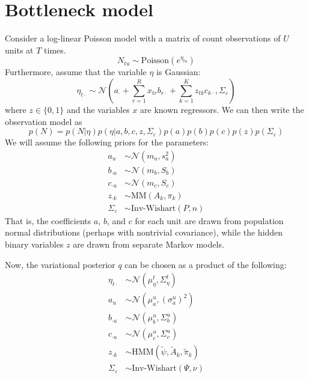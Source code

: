 \documentclass[11pt]{article}
\begin{document}
\section{Bottleneck model}
Consider a log-linear Poisson model with a matrix of count observations of $U$ units at $T$ times.
\begin{equation}
    N_{tu} \sim \mathrm{Poisson}(e^{\eta_{tu}})
\end{equation}
Furthermore, assume that the variable $\eta$ is Gaussian:
\begin{equation}
    \eta_{t\cdot} \sim \mathcal{N}\left(a_{\cdot} + \sum_{r=1}^R x_{tr} b_{r\cdot} +
    \sum_{k=1}^K z_{tk} c_{k\cdot}, \Sigma_\varepsilon\right)
\end{equation}
where $z \in \{0, 1\}$ and the variables $x$ are known regressors. We can then write the observation model as
\begin{equation}
    p(N) = p(N|\eta) p(\eta|a, b, c, z, \Sigma_\varepsilon) p(a) p(b) p(c) p(z) p(\Sigma_\varepsilon)
\end{equation}
We will assume the following priors for the parameters:
\begin{align}
    a_u &\sim \mathcal{N}(m_a, s_a^2) \\
    b_{\cdot u} &\sim \mathcal{N}(m_b, S_b) \\
    c_{\cdot u} &\sim \mathcal{N}(m_c, S_c) \\
    z_{\cdot k} &\sim \mathrm{MM}(A_k, \pi_k) \\
    \Sigma_\varepsilon &\sim \text{Inv-Wishart}(P, n)
\end{align}
That is, the coefficients $a$, $b$, and $c$ for each unit are drawn from population normal distributions (perhaps with nontrivial covariance), while the hidden binary variables $z$ are drawn from separate Markov models.

Now, the variational posterior $q$ can be chosen as a product of the following:
\begin{align}
    \eta_{t\cdot} &\sim \mathcal{N}(\mu^t_\eta, \Sigma^t_\eta) \\
    a_u &\sim \mathcal{N}(\mu^u_a, (\sigma^u_a)^2) \\
    b_{\cdot u} &\sim \mathcal{N}(\mu^u_b, \Sigma^u_b) \\
    c_{\cdot u} &\sim \mathcal{N}(\mu^u_c, \Sigma^u_c) \\
    z_{\cdot k} &\sim \mathrm{HMM}(\tilde{\psi}, \tilde{A}_k, \tilde{\pi}_k) \\
    \Sigma_\varepsilon &\sim \text{Inv-Wishart}(\Psi, \nu)
\end{align}
\end{document}
